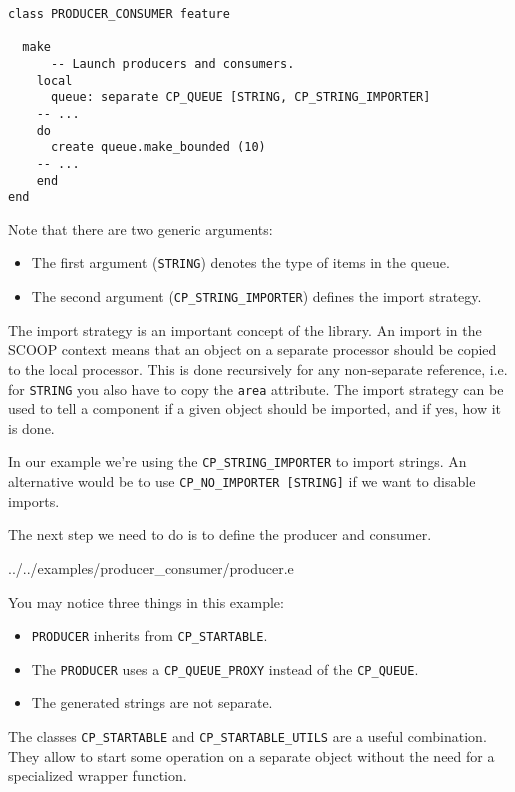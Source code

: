 \documentclass[a4paper,10pt]{report}
\begin{document}
\begin{lstlisting}
class PRODUCER_CONSUMER feature

  make
      -- Launch producers and consumers.
    local
      queue: separate CP_QUEUE [STRING, CP_STRING_IMPORTER]
	-- ...
    do
      create queue.make_bounded (10)
	-- ...
    end
end
\end{lstlisting}

Note that there are two generic arguments:
\begin{itemize}
\item The first argument (\lstinline!STRING!) denotes the type of items in the queue.
\item The second argument (\lstinline!CP_STRING_IMPORTER!) defines the import strategy.
\end{itemize}

The import strategy is an important concept of the library.
An import in the SCOOP context means that an object on a separate processor should be copied to the local processor.
This is done recursively for any non-separate reference, i.e. for  \lstinline!STRING! you also have to copy the \lstinline!area! attribute.
The import strategy can be used to tell a component if a given object should be imported, and if yes, how it is done.

In our example we're using the \lstinline!CP_STRING_IMPORTER! to import strings.
An alternative would be to use \lstinline!CP_NO_IMPORTER [STRING]! if we want to disable imports.

The next step we need to do is to define the producer and consumer.

 {../../examples/producer_consumer/producer.e}

You may notice three things in this example:

\begin{itemize}
 \item \lstinline!PRODUCER! inherits from \lstinline!CP_STARTABLE!.
 \item The \lstinline!PRODUCER! uses a \lstinline!CP_QUEUE_PROXY! instead of the \lstinline!CP_QUEUE!.
 \item The generated strings are not separate.
\end{itemize}

The classes \lstinline!CP_STARTABLE! and \lstinline!CP_STARTABLE_UTILS! are a useful combination.
They allow to start some operation on a separate object without the need for a specialized wrapper function.
\end{document}
